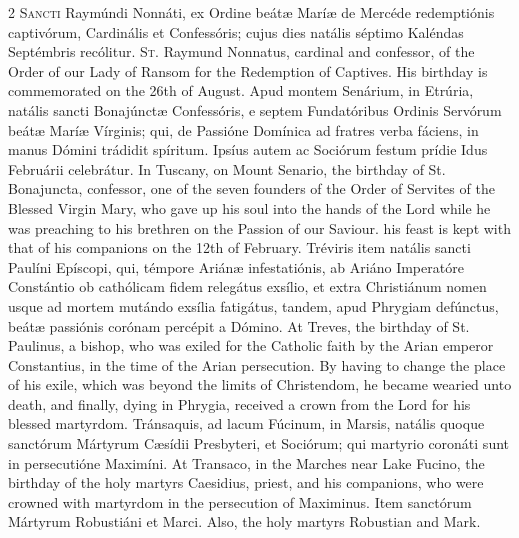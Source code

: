 \begin{paracol}{2}
\lettrine[lines=2]{S}{ancti} Raymúndi Nonnáti, 
 ex Ordine beátæ Maríæ de Mercéde redemptiónis captivórum, Cardinális et 
 Confessóris; cujus dies natális séptimo Kaléndas Septémbris recólitur.
\switchcolumn
{}
\lettrine[lines=2]{S}{t.} Raymund Nonnatus, cardinal and 
 confessor, of the Order of our Lady of Ransom for the Redemption of 
 Captives. His birthday is commemorated on the 26th of August.
\switchcolumn*
{}
Apud montem Senárium, 
 in Etrúria, natális sancti Bonajúnctæ Confessóris, e septem Fundatóribus 
 Ordinis Servórum beátæ Maríæ Vírginis; qui, de Passióne Domínica ad fratres 
 verba fáciens, in manus Dómini trádidit spíritum. Ipsíus autem ac 
 Sociórum festum prídie Idus Februárii celebrátur.
\switchcolumn
{}
In Tuscany, on Mount Senario, the 
 birthday of St. Bonajuncta, confessor, one of the seven founders of the 
 Order of Servites of the Blessed Virgin Mary, who gave up his soul into the 
 hands of the Lord while he was preaching to his brethren on the Passion of 
 our Saviour. his feast is kept with that of his companions on the 12th 
 of February.
\switchcolumn*
{}
Tréviris item natális 
 sancti Paulíni Epíscopi, qui, témpore Ariánæ infestatiónis, ab Ariáno 
 Imperatóre Constántio ob cathólicam fidem relegátus exsílio, et extra 
 Christiánum nomen usque ad mortem mutándo exsília fatigátus, tandem, apud 
 Phrygiam defúnctus, beátæ passiónis corónam percépit a Dómino.
\switchcolumn
{}
At Treves, the birthday of St. 
 Paulinus, a bishop, who was exiled for the Catholic faith by the Arian 
 emperor Constantius, in the time of the Arian persecution. By having 
 to change the place of his exile, which was beyond the limits of 
 Christendom, he became wearied unto death, and finally, dying in Phrygia, 
 received a crown from the Lord for his blessed martyrdom.
\switchcolumn*
{}
Tránsaquis, ad lacum 
 Fúcinum, in Marsis, natális quoque sanctórum Mártyrum Cæsídii Presbyteri, et 
 Sociórum; qui martyrio coronáti sunt in persecutióne Maximíni.
\switchcolumn
{}
At Transaco, in the Marches near 
 Lake Fucino, the birthday of the holy martyrs Caesidius, priest, and his 
 companions, who were crowned with martyrdom in the persecution of Maximinus.
\switchcolumn*
{}
Item sanctórum Mártyrum 
 Robustiáni et Marci.
\switchcolumn
{}
Also, the holy martyrs Robustian and 
 Mark.
\switchcolumn*

\end{paracol}
